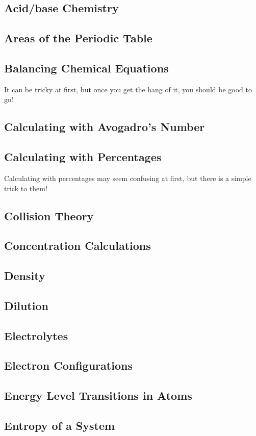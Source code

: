 \documentclass[10pt, roman]{article}
\begin{document}
\subsection{Acid/base Chemistry}
\subsection{Areas of the Periodic Table}
\subsection{Balancing Chemical Equations}
It can be tricky at first, but once you get the hang of it, you should be good to go!
\subsection{Calculating with Avogadro's Number}
\subsection{Calculating with Percentages}
Calculating with percentages may seem confusing at first, but there is a simple trick to them!
\subsection{Collision Theory}
\subsection{Concentration Calculations}
\subsection{Density}
\subsection{Dilution}
\subsection{Electrolytes}
\subsection{Electron Configurations}
\subsection{Energy Level Transitions in Atoms}
\subsection{Entropy of a System}
\end{document}
